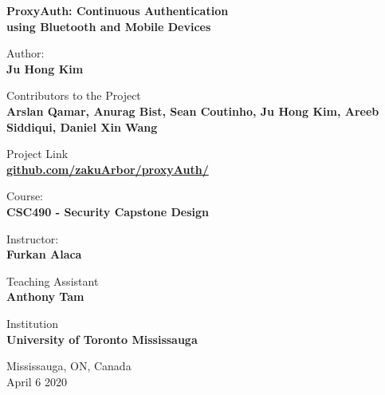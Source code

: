 \documentclass[letterpaper,twocolumn,10pt]{article}
\begin{document}
\begin{titlepage}
	\vspace*{2.5cm}
	\Huge
	\begin{flushleft}
	\textbf{ProxyAuth: Continuous Authentication\\ using Bluetooth and Mobile Devices}

	\large
            
	\vspace{3cm}
	\normalsize
	Author:\\ 
	\large \textbf{Ju Hong Kim}

	\vspace{0.5cm}
	\normalsize
	Contributors to the Project\\
	\textbf{Arslan Qamar, Anurag Bist, Sean Coutinho, Ju Hong Kim, Areeb Siddiqui, Daniel Xin Wang}
	
	\vspace{0.5cm}
	Project Link\\
	\large \textbf{\href{https://github.com/zakuArbor/proxyAuth/}{github.com/zakuArbor/proxyAuth/}}
	
            
	\vspace{0.5cm}
	\onehalfspacing
	\begin{singlespace}
	\normalsize Course:\\
	\large \textbf{CSC490 - Security Capstone Design}
	\end{singlespace}
    
    \begin{singlespace}
	\normalsize Instructor:\\
	\large \textbf{Furkan Alaca}
	\end{singlespace}
      
    \begin{singlespace}
	\normalsize Teaching Assistant\\
	\large \textbf{Anthony Tam}
	\end{singlespace}

	\begin{singlespace}
	\normalsize Institution\\
	\large \textbf{University of Toronto Mississauga}
	\end{singlespace}
	
	\vspace{0.75cm}
	\normalsize
	Mississauga, ON, Canada\\
	April 6 2020
	\end{flushleft}
	\vspace{4cm}
            
\end{titlepage}
\end{document}
